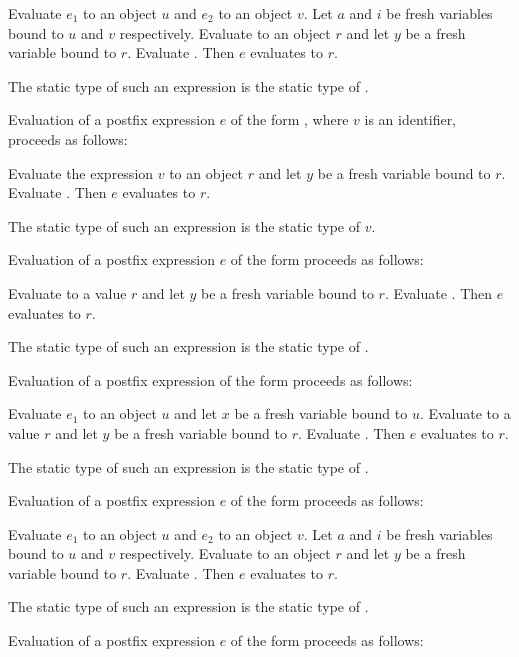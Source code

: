 \documentclass[makeidx]{article}
\begin{document}
\LMHash{}%
Evaluate $e_1$ to an object $u$ and $e_2$ to an object $v$.
Let $a$ and $i$ be fresh variables bound to $u$ and $v$ respectively.
Evaluate  to an object $r$
and let $y$ be a fresh variable bound to $r$.
Evaluate .
Then $e$ evaluates to $r$.

\LMHash{}%
The static type of such an expression is the static type of .

\LMHash{}%
Evaluation of a postfix expression $e$ of the form , where $v$ is an identifier, proceeds as follows:

\LMHash{}%
Evaluate the expression $v$ to an object $r$
and let $y$ be a fresh variable bound to $r$.
Evaluate .
Then $e$ evaluates to $r$.

\LMHash{}%
The static type of such an expression is the static type of $v$.

\LMHash{}%
Evaluation of a postfix expression $e$ of the form 
proceeds as follows:

\LMHash{}%
Evaluate  to a value $r$
and let $y$ be a fresh variable bound to $r$.
Evaluate .
Then $e$ evaluates to $r$.

\LMHash{}%
The static type of such an expression is the static type of .

\LMHash{}%
Evaluation of a postfix expression of the form 
proceeds as follows:

\LMHash{}%
Evaluate $e_1$ to an object $u$ and let $x$ be a fresh variable bound to $u$.
Evaluate  to a value $r$
and let $y$ be a fresh variable bound to $r$.
Evaluate .
Then $e$ evaluates to $r$.

\LMHash{}%
The static type of such an expression is the static type of .

\LMHash{}%
Evaluation of a postfix expression $e$ of the form 
proceeds as follows:

\LMHash{}%
Evaluate $e_1$ to an object $u$ and $e_2$ to an object $v$.
Let $a$ and $i$ be fresh variables bound to $u$ and $v$ respectively.
Evaluate  to an object $r$
and let $y$ be a fresh variable bound to $r$.
Evaluate .
Then $e$ evaluates to $r$.

\LMHash{}%
The static type of such an expression is the static type of .

\LMHash{}%
Evaluation of a postfix expression $e$ of the form 
proceeds as follows:
\end{document}
